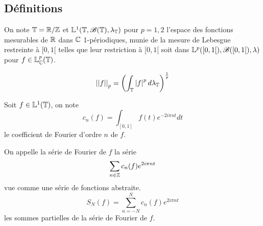 \subsection{Définitions}


\begin{definition}
	On note $\mathbb{T} = \mathbb{R} / \mathbb{Z}$ et $\mathbb{L}^1(\mathbb{T}, \mathscr{B} (\mathbb{T}), \lambda_{\mathbb{T}})$ pour $p = 1,2$ l'espace des fonctions mesurables de $\mathbb{R}$ dans $\mathbb{C}$ 1-périodiques, munie de la mesure de Lebesgue restreinte à $[0,1[$
	telles que leur restriction à $[0,1[$ soit dans $\mathbb{L}^p([0,1[), \mathscr{B}([0,1[), \lambda)$ pour $f \in \mathbb{L}_{\mathbb{C}}^p(\mathbb{T})$.

	$$ {\left|\left|f\right|\right|}_p = \left( \int_{\mathbb{T}} \left|f\right|^p d\lambda_{\mathbb{T}} \right)^{\frac{1}{p}} $$
\end{definition}

\begin{definition}
	Soit $f \in \mathbb{L}^1(\mathbb{T})$, on note
	$$ c_n(f) = \int_{[0,1]} f(t) e^{-2i\pi nt} dt $$
	le coefficient de Fourier d'ordre $n$ de $f$.

	On appelle la série de Fourier de $f$ la série
	$$ \sum_{n \in \mathbb{Z}} c_n(f) e^{2i\pi nt} $$
	vue comme une série de fonctions abstraite.
	$$ S_N(f) = \sum_{n = -N}^{N} c_n(f) e^{2i\pi nt} $$
	les sommes partielles de la série de Fourier de $f$.
\end{definition}
